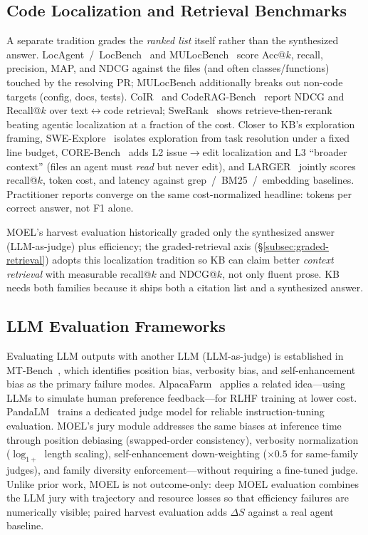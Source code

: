 \subsection{Code Localization and Retrieval Benchmarks}

A separate tradition grades the \emph{ranked list} itself rather than the
synthesized answer.  LocAgent~/~LocBench~\cite{chen2025locagent} and
MULocBench~\cite{jiang2025mulocbench} score Acc@$k$, recall, precision, MAP, and
NDCG against the files (and often classes/functions) touched by the resolving PR;
MULocBench additionally breaks out non-code targets (config, docs, tests).
CoIR~\cite{li2025coir} and CodeRAG-Bench~\cite{wang2024coderag} report NDCG and
Recall@$k$ over text$\leftrightarrow$code retrieval; SweRank~\cite{reddy2025swerank}
shows retrieve-then-rerank beating agentic localization at a fraction of the cost.
Closer to KB's exploration framing, SWE-Explore~\cite{chen2026sweexplore}
isolates exploration from task resolution under a fixed line budget, CORE-Bench~\cite{suresh2026corebench}
adds L2 issue$\rightarrow$edit localization and L3 ``broader context'' (files an
agent must \emph{read} but never edit), and LARGER~\cite{liu2026larger} jointly
scores recall@$k$, token cost, and latency against grep~/~BM25~/~embedding
baselines.  Practitioner reports converge on the same cost-normalized headline:
tokens per correct answer, not F1 alone.

MOEL's harvest evaluation historically graded only the synthesized answer
(LLM-as-judge) plus efficiency; the graded-retrieval axis
(\S\ref{subsec:graded-retrieval}) adopts this localization tradition so KB can
claim better \emph{context retrieval} with measurable recall@$k$ and NDCG@$k$,
not only fluent prose.  KB needs both families because it ships both a citation
list and a synthesized answer.



\subsection{LLM Evaluation Frameworks}

Evaluating LLM outputs with another LLM (LLM-as-judge) is established in
MT-Bench~\cite{zheng2023judging}, which identifies position bias, verbosity
bias, and self-enhancement bias as the primary failure modes.
AlpacaFarm~\cite{dubois2024alpacafarm} applies a related idea—using LLMs to
simulate human preference feedback—for RLHF training at lower cost.
PandaLM~\cite{wang2023pandalm} trains a dedicated judge model for reliable
instruction-tuning evaluation.  MOEL's jury module addresses the same biases at inference time
through position debiasing (swapped-order consistency), verbosity normalization
($\log_{1+}$ length scaling), self-enhancement down-weighting ($\times 0.5$ for
same-family judges), and family diversity enforcement---without requiring a
fine-tuned judge.  Unlike prior work, MOEL is not outcome-only: deep MOEL evaluation combines
the LLM jury with trajectory and resource losses so that
efficiency failures are numerically visible; paired harvest evaluation adds $\Delta S$
against a real agent baseline.

